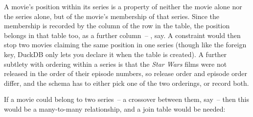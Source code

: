 {    A movie's position within its series is a property of neither the movie alone nor the series alone, but of the movie's membership of that series.
    Since the membership is recorded by the  column of the row in the  table, the position belongs in that table too, as a further column~-- , say.
    A constraint  would then stop two movies claiming the same position in one series (though like the foreign key, DuckDB only lets you declare it when the table is created).
    A further subtlety with ordering within a series is that the \emph{Star Wars} films were not released in the order of their episode numbers, so release order and episode order differ, and the schema has to either pick one of the two orderings, or record both.

    If a movie could belong to two series~-- a crossover between them, say~-- then this would be a many-to-many relationship, and a join table would be needed:
    \inputminted[fontsize=\small]{sql}{code/in-series.sql}
}


